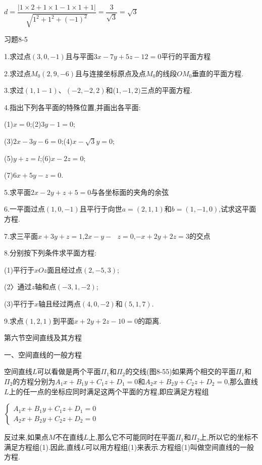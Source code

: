 \documentclass[oneside]{book}
\begin{document}
$d = \dfrac{{|1 \times 2 + 1 \times 1 - 1 \times 1 + 1|}}{{\sqrt {{1^2} + {1^2} + {{( - 1)}^2}} }} = \dfrac{3}{{\sqrt 3 }} = \sqrt 3 $

习题8-5

1.求过点$(3,0,-1)$且与平面$3x - 7y + 5z - 12 = 0$平行的平面方程

2.求过点${M_0}\left( {2,9, - 6} \right)$且与连接坐标原点及点${M_0}$的线段$O{M_0}$垂直的平面方程.

3.求过$(1,1-1)$、$(-2,-2,2)$和($1,-1,2)$三点的平面方程.

4.指出下列各平面的特殊位置,并画出各平面:

(1)$x = 0$\quad ;\quad (2)$3y - 1 = 0$\quad ;

(3)$2x - 3y - 6 = 0$\quad ;\quad (4)$x - \sqrt 3 y = 0$\quad ;

(5)$y + z = l$\quad ;\quad (6)$x - 2z = 0$\quad ;

(7)$6x + 5y - z = 0$\quad .

5.求平面$2x - 2y + z + 5 = 0$与各坐标面的夹角的余弦

6.一平面过点$(1,0,-1)$且平行于向世$a = \left( {2,1,1} \right)$和$b = \left( {1, - 1,0} \right)$,试求这平面方程.

7.求三平面$x + 3y + z = 1$,$2x - y - {\text{ }}z = 0$,$ - x + 2y + 2z = 3$的交点

8.分别按下列条件求平面方程:

(1)平行于$xOz$面且经过点$(2,-5,3)$;

(2〉通过$z$轴和点$(-3,1,-2)$;

(3)平行于$x$轴且经过两点$(4,0,-2)$和$(5,1,7)$.

9.求点$(1,2,1)$到平面$x + 2y + 2z - 10 = 0$的距离.

第六节空间直线及其方程

一、空间直线的一般方程

空间直线$L$可以看做是两个平面${\Pi _1}$和${\Pi _2}$的交线(图8-55)如果两个相交的平面${\Pi _1}$和${\Pi _2}$的方程分别为${A_1}x + {B_1}y + {C_1}z + {D_1} = 0$和${A_2}x + {B_2}y + {C_2}z + {D_2} = 0$,那么直线$L$上的任一点的坐标应同时满足这两个平面的方程,即应满足方程组

$\left\{\begin{array}{l}{A_{1} x+B_{1} y+C_{1} z+D_{1}=0} \\ {A_{2} x+B_{2} y+C_{2} z+D_{2}=0}\end{array}\right.$

反过来,如果点$M$不在直线$L$上,那么它不可能同时在平面${\Pi _1}$和${\Pi _2}$上,所以它的坐标不满足方程组(1).因此,直线$L$可以用方程组(1)来表示.方程组(1)叫做空间直线的一般方程.
\end{document}
